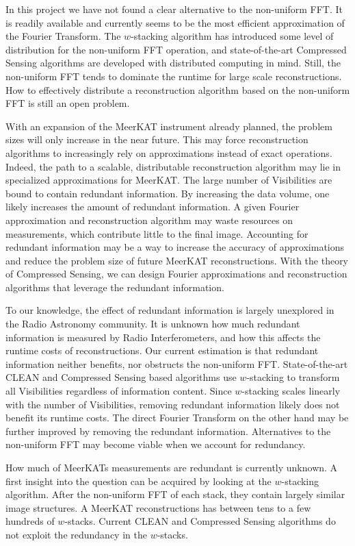 In this project we have not found a clear alternative to the non-uniform FFT. It is readily available and currently seems to be the most efficient approximation of the Fourier Transform. The $w$-stacking algorithm\cite{offringa2014wsclean} has introduced some level of distribution for the non-uniform FFT operation, and state-of-the-art Compressed Sensing algorithms\cite{dabbech2018cygnus, pratley2018fast} are developed with distributed computing in mind. Still, the non-uniform FFT tends to dominate the runtime for large scale reconstructions. How to effectively distribute a reconstruction algorithm based on the non-uniform FFT is still an open problem.

With an expansion of the MeerKAT instrument already planned, the problem sizes will only increase in the near future. This may force reconstruction algorithms to increasingly rely on approximations instead of exact operations. Indeed, the path to a scalable, distributable reconstruction algorithm may lie in specialized approximations for MeerKAT. The large number of Visibilities are bound to contain redundant information. By increasing the data volume, one likely increases the amount of redundant information. A given Fourier approximation and reconstruction algorithm may waste resources on measurements, which contribute little to the final image. Accounting for redundant information may be a way to increase the accuracy of approximations and reduce the problem size of future MeerKAT reconstructions. With the theory of Compressed Sensing, we can design Fourier approximations and reconstruction algorithms that leverage the redundant information.

To our knowledge, the effect of redundant information is largely unexplored in the Radio Astronomy community. It is unknown how much redundant information is measured by Radio Interferometers, and how this affects the runtime costs of reconstructions. Our current estimation is that redundant information neither benefits, nor obstructs the non-uniform FFT. State-of-the-art CLEAN and Compressed Sensing based algorithms use $w$-stacking to transform all Visibilities regardless of information content. Since $w$-stacking scales linearly with the number of Visibilities, removing redundant information likely does not benefit its runtime costs. The direct Fourier Transform on the other hand may be further improved by removing the redundant information. Alternatives to the non-uniform FFT may become viable when we account for redundancy.

How much of MeerKATs measurements are redundant is currently unknown. A first insight into the question can be acquired by looking at the $w$-stacking algorithm. After the non-uniform FFT of each stack, they contain largely similar image structures. A MeerKAT reconstructions has between tens to a few hundreds of $w$-stacks. Current CLEAN and Compressed Sensing algorithms do not exploit the redundancy in the $w$-stacks.

